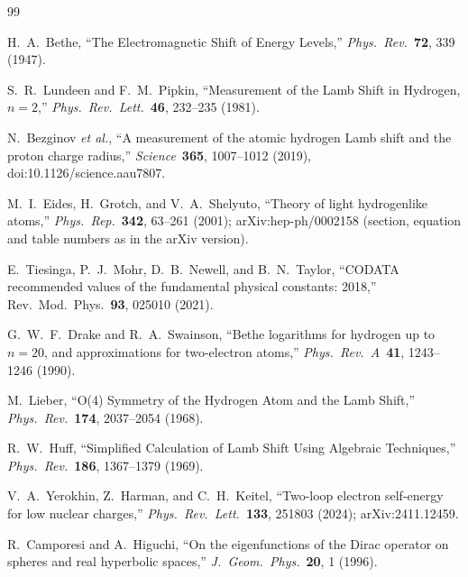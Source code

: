 \documentclass[11pt]{article}
\begin{document}
\begin{thebibliography}{99}

H.~A.~Bethe, ``The Electromagnetic Shift of Energy Levels,''
\textit{Phys.\ Rev.}\ \textbf{72}, 339 (1947).

S.~R.~Lundeen and F.~M.~Pipkin, ``Measurement of the Lamb Shift in
Hydrogen, $n = 2$,'' \textit{Phys.\ Rev.\ Lett.}\ \textbf{46}, 232--235
(1981).

N.~Bezginov \textit{et al.}, ``A measurement of the atomic hydrogen
Lamb shift and the proton charge radius,'' \textit{Science}\
\textbf{365}, 1007--1012 (2019), doi:10.1126/science.aau7807.

M.~I.~Eides, H.~Grotch, and V.~A.~Shelyuto, ``Theory of light
hydrogenlike atoms,'' \textit{Phys.\ Rep.}\ \textbf{342}, 63--261
(2001); arXiv:hep-ph/0002158 (section, equation and table numbers as
in the arXiv version).

E.~Tiesinga, P.~J.~Mohr, D.~B.~Newell, and B.~N.~Taylor,
``CODATA recommended values of the fundamental physical constants:
2018,'' Rev.\ Mod.\ Phys.\ \textbf{93}, 025010 (2021).

G.~W.~F.~Drake and R.~A.~Swainson, ``Bethe logarithms for hydrogen
up to $n=20$, and approximations for two-electron atoms,''
\textit{Phys.\ Rev.\ A}\ \textbf{41}, 1243--1246 (1990).

M.~Lieber, ``O(4) Symmetry of the Hydrogen Atom and the Lamb Shift,''
\textit{Phys.\ Rev.}\ \textbf{174}, 2037--2054 (1968).

R.~W.~Huff, ``Simplified Calculation of Lamb Shift Using Algebraic
Techniques,'' \textit{Phys.\ Rev.}\ \textbf{186}, 1367--1379 (1969).

V.~A.~Yerokhin, Z.~Harman, and C.~H.~Keitel,
``Two-loop electron self-energy for low nuclear charges,''
\textit{Phys.\ Rev.\ Lett.}\ \textbf{133}, 251803 (2024); arXiv:2411.12459.

R.~Camporesi and A.~Higuchi, ``On the eigenfunctions of the Dirac
operator on spheres and real hyperbolic spaces,''
\textit{J.\ Geom.\ Phys.}\ \textbf{20}, 1 (1996).

\end{thebibliography}
\end{document}
